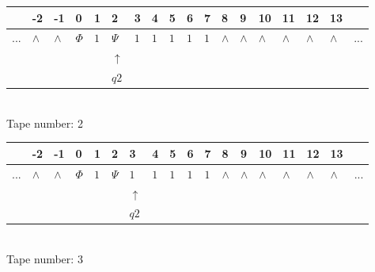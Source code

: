 \documentclass[11pt]{article}
\begin{document}
\begin{table}[H]
\centering
\begin{tabular}{llllllllllllllllll}
 & -2 & -1 & 0 & 1 & 2 & 3 & 4 & 5 & 6 & 7 & 8 & 9 & 10 & 11 & 12 & 13 & \\
\hline
$...$ & \multicolumn{1}{|l|}{$\wedge$} & \multicolumn{1}{|l|}{$\wedge$} & \multicolumn{1}{|l|}{$\Phi$} & \multicolumn{1}{|l|}{$1$} & \multicolumn{1}{|l|}{$\Psi$} & \multicolumn{1}{|l|}{$1$} & \multicolumn{1}{|l|}{$1$} & \multicolumn{1}{|l|}{$1$} & \multicolumn{1}{|l|}{$1$} & \multicolumn{1}{|l|}{$1$} & \multicolumn{1}{|l|}{$\wedge$} & \multicolumn{1}{|l|}{$\wedge$} & \multicolumn{1}{|l|}{$\wedge$} & \multicolumn{1}{|l|}{$\wedge$} & \multicolumn{1}{|l|}{$\wedge$} & \multicolumn{1}{|l|}{$\wedge$} & $...$\\
\hline
&  &  &  &  & $\uparrow$ &  &  &  &  &  &  &  &  &  &  &  &  \\
&  &  &  &  & $ q2 $ &  &  &  &  &  &  &  &  &  &  &  &  \\
\end{tabular}
\\
Tape number: 2
\noindent\makebox[\linewidth]{\hdashrule{\textwidth}{1pt}{1pt}}\end{table}

\begin{table}[H]
\centering
\begin{tabular}{llllllllllllllllll}
 & -2 & -1 & 0 & 1 & 2 & 3 & 4 & 5 & 6 & 7 & 8 & 9 & 10 & 11 & 12 & 13 & \\
\hline
$...$ & \multicolumn{1}{|l|}{$\wedge$} & \multicolumn{1}{|l|}{$\wedge$} & \multicolumn{1}{|l|}{$\Phi$} & \multicolumn{1}{|l|}{$1$} & \multicolumn{1}{|l|}{$\Psi$} & \multicolumn{1}{|l|}{$1$} & \multicolumn{1}{|l|}{$1$} & \multicolumn{1}{|l|}{$1$} & \multicolumn{1}{|l|}{$1$} & \multicolumn{1}{|l|}{$1$} & \multicolumn{1}{|l|}{$\wedge$} & \multicolumn{1}{|l|}{$\wedge$} & \multicolumn{1}{|l|}{$\wedge$} & \multicolumn{1}{|l|}{$\wedge$} & \multicolumn{1}{|l|}{$\wedge$} & \multicolumn{1}{|l|}{$\wedge$} & $...$\\
\hline
&  &  &  &  &  & $\uparrow$ &  &  &  &  &  &  &  &  &  &  &  \\
&  &  &  &  &  & $ q2 $ &  &  &  &  &  &  &  &  &  &  &  \\
\end{tabular}
\\
Tape number: 3
\noindent\makebox[\linewidth]{\hdashrule{\textwidth}{1pt}{1pt}}\end{table}
\end{document}

